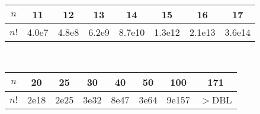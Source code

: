 {\small
\begin{table}[H]
\begin{tabular}{cccccccc}
$n$  & 11    & 12    & 13    & 14     & 15     & 16     & 17\\
\hline
$n!$ & 4.0e7 & 4.8e8 & 6.2e9 & 8.7e10 & 1.3e12 & 2.1e13 & 3.6e14\\
\end{tabular}\\
\begin{tabular}{cccccccc}
$n$  & 20   & 25   & 30   & 40   & 50   & 100   & 171\\
\hline
$n!$ & 2e18 & 2e25 & 3e32 & 8e47 & 3e64 & 9e157 & \scriptsize{$>$DBL}\\
\end{tabular}
\end{table}}